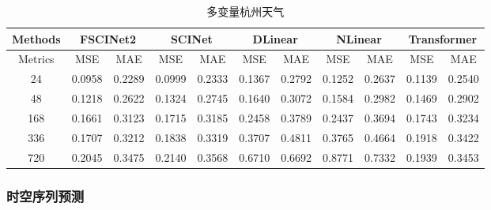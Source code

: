 \documentclass[twoside,a4paper]{article}
\begin{document}
\begin{CJK*}{UTF8}{gkai}
\begin{table}[H]
  \centering
  \caption{多变量杭州天气}
  \begin{tabular}{c c c c c c c c c c c} %
    \hline
    \textbf{Methods} & \multicolumn{2}{c}{FSCINet2}& \multicolumn{2}{c}{SCINet} & \multicolumn{2}{c}{DLinear}
    &\multicolumn{2}{c}{NLinear} &\multicolumn{2}{c}{Transformer}\\
    \hline
    Metrics & MSE & MAE & MSE & MAE & MSE & MAE & MSE & MAE & MSE & MAE\\
    \hline\hline
     24  & 0.0958 & 0.2289 & 0.0999 & 0.2333 & 0.1367 & 0.2792 &
                                                                 0.1252 & 0.2637 & 0.1139 & 0.2540\\ %
     48  & 0.1218 & 0.2622 & 0.1324 & 0.2745 & 0.1640 & 0.3072 &
                                                                 0.1584 & 0.2982 & 0.1469 & 0.2902\\ %
     168 & 0.1661 & 0.3123 & 0.1715 & 0.3185 & 0.2458 & 0.3789 &
                                                                 0.2437 & 0.3694 & 0.1743 & 0.3234\\ %
     336 & 0.1707 & 0.3212 & 0.1838 & 0.3319 & 0.3707 & 0.4811 &
                                                                 0.3765 & 0.4664 & 0.1918 & 0.3422\\ %
     720 & 0.2045 & 0.3475 & 0.2140 & 0.3568 & 0.6710 & 0.6692 &
                                                                 0.8771 & 0.7332 & 0.1939 & 0.3453\\ %
    \hline\hline
  \end{tabular}
  \label{tab:pro_pro}
\end{table}

\subsubsection{时空序列预测}


\end{CJK*}
\end{document}
